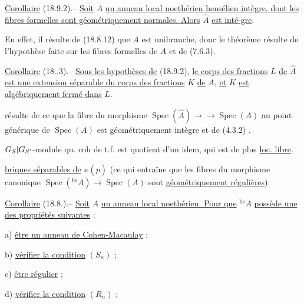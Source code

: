 \uline{Corollaire} (18.9.2).-- \uline{Soit} $A$ \uline{un anneau local noethérien hensélien intègre, dont les fibres formelles sont géométriquement normales. Alors} $\hat A$ \uline{est inté-}\uline{gre}.

En effet, il résulte de (18.8.12) que $A$ est unibranche, donc  le théorème résulte de l'hypothèse faite sur les fibres formelles de $A$ et de (7.6.3).

\uline{Corollaire} (18..3).-- \uline{Sous les hypothèses de} (18.9.2), \uline{le corps des fractions} $L$ \uline{de} $\hat A$ \uline{est une extension séparable du corps des fractions} $K$ \uline{de} $A$, \uline{et} $K$ \uline{est algébriquement fermé dans} $L$.

   résulte de ce que la fibre du morphisme $\operatorname{Spec}(\hat A)\to{}\to\operatorname{Spec}(A)$ au point générique de $\operatorname{Spec}(A)$ est géométriquement intègre et de (4.3.2) .


$G_S|G_{S'}$-module  qu. coh de t.f. est quotient d'un idem, qui est de plus \uline{loc. libre}.


\uline{briques séparables de} $\kappa(\underline p)$ (ce qui entraîne que les fibres du morphisme canonique $\operatorname{Spec}({}^{\mathrm{hs}}A)\to\operatorname{Spec}(A)$ sont \uline{géométriquement régulières}).

\uline{Corollaire} (18.8.).-- \uline{Soit} $A$ \uline{un anneau local noethérien. Pour que} ${}^{\mathrm{hs}}A$ \uline{possède une des propriétés suivantes} :

a) \uline{être un anneau de Cohen-Macaulay} ;

b) \uline{vérifier la condition} $(S_n)$ ;

c) \uline{être régulier} ;

d) \uline{vérifier la condition} $(R_n)$ ;


